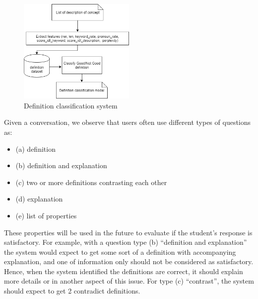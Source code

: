\documentclass[letterpaper%
, twoside%
, 12pt%
,these%
, english%
,creativecommons,hyperref, withAlgo2e %
]{thETS}
\begin{document}
\begin{figure}
	\includegraphics[width=0.5\textwidth]{Figures/dc1.png}
	\caption{Definition classification system}
	\label{datapre}
\end{figure} 
Given a conversation, we observe that users often use different types of questions as:
\begin{itemize}
	\item (a) definition
	\item (b) definition and explanation
	\item (c) two or more definitions contrasting each other
	\item (d) explanation
	\item (e) list of properties
\end{itemize}

These properties will be used in the future to evaluate if the student’s response is satisfactory. For example, with a question type (b) “definition and explanation” the system would expect to get some sort of a definition with accompanying explanation, and one of information only should not be considered as satisfactory. Hence, when the system identified the definitions are correct, it should explain more details or in another aspect of this issue.  For type (c) “contrast”,  the system should expect to get 2 contradict definitions. 
\end{document}
